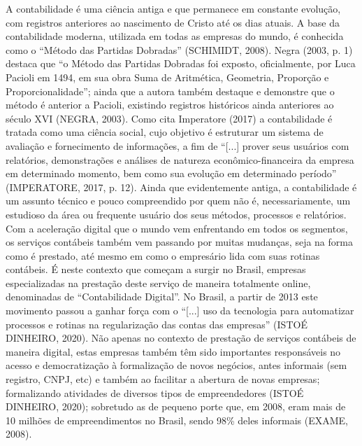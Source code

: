 \documentclass[twocolumn]{rbef}
\newcommand{\1}{\mathbbm{1}}
\begin{document}
A contabilidade é uma ciência antiga e que permanece em constante evolução, com registros anteriores ao nascimento de Cristo até os dias atuais. A base da contabilidade moderna, utilizada em todas as empresas do mundo, é conhecida como o “Método das Partidas Dobradas” (SCHIMIDT, 2008)\cite{SCHMIDT}. Negra (2003, p. 1)\cite{NEGRA} destaca que “o Método das Partidas Dobradas foi exposto, oficialmente, por Luca Pacioli em 1494, em sua obra Suma de Aritmética, Geometria, Proporção e Proporcionalidade”; ainda que a autora também destaque e demonstre que o método é anterior a Pacioli, existindo registros históricos ainda anteriores ao século XVI (NEGRA, 2003)\cite{NEGRA}.
\newline\linebreak Como cita Imperatore (2017)\cite{IMPERATORE} a contabilidade é tratada como uma ciência social, cujo objetivo é estruturar um sistema de avaliação e fornecimento de informações, a fim de “[...] prover seus usuários com relatórios, demonstrações e análises de natureza econômico-financeira da empresa em determinado momento, bem como sua evolução em determinado período” (IMPERATORE, 2017, p. 12)\cite{IMPERATORE}. Ainda que evidentemente antiga, a contabilidade é um assunto técnico e pouco compreendido por quem não é, necessariamente, um estudioso da área ou frequente usuário dos seus métodos, processos e relatórios. 
\newline\linebreak Com a aceleração digital que o mundo vem enfrentando em todos os segmentos, os serviços contábeis também vem passando por muitas mudanças, seja na forma como é prestado, até mesmo em como o empresário lida com suas rotinas contábeis. É neste contexto que começam a surgir no Brasil, empresas especializadas na prestação deste serviço de maneira totalmente online, denominadas de “Contabilidade Digital”. No Brasil, a partir de 2013 este movimento passou a ganhar força com o “[...] uso da tecnologia para automatizar processos e rotinas na regularização das contas das empresas” (ISTOÉ DINHEIRO, 2020)\cite{ISTOE}.
\newline\linebreak Não apenas no contexto de prestação de serviços contábeis de maneira digital, estas empresas também têm sido importantes responsáveis no acesso e democratização à formalização de novos negócios, antes informais (sem registro, CNPJ, etc) e também ao facilitar a abertura de novas empresas; formalizando atividades de diversos tipos de empreendedores (ISTOÉ DINHEIRO, 2020)\cite{ISTOE}; sobretudo as de pequeno porte que, em 2008, eram mais de 10 milhões de empreendimentos no Brasil, sendo 98\% deles informais (EXAME, 2008)\cite{EXAME}.
\end{document}
